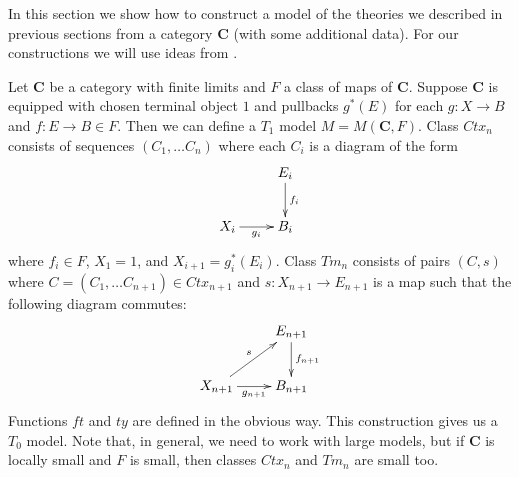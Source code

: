 \documentclass{amsart}
\theoremstyle{definition}
\theoremstyle{remark}
\newcommand{\cat}[1]{\mathbf{#1}}
\newcommand{\C}{\cat{C}}
\numberwithin{figure}{section}
\begin{document}
In this section we show how to construct a model of the theories we described in previous sections from a category $\C$ (with some additional data).
For our constructions we will use ideas from \cite{local-universes}.

Let $\C$ be a category with finite limits and $F$ a class of maps of $\C$.
Suppose $\C$ is equipped with chosen terminal object $1$ and pullbacks $g^*(E)$ for each $g : X \to B$ and $f : E \to B \in F$.
Then we can define a $T_1$ model $M = M(\C,F)$.
Class $Ctx_n$ consists of sequences $(C_1, \ldots C_n)$ where each $C_i$ is a diagram of the form
\[ \xymatrix{                  & E_i \ar[d]^{f_i} \\
              X_i \ar[r]_{g_i} & B_i
            } \]
where $f_i \in F$, $X_1 = 1$, and $X_{i+1} = g_i^*(E_i)$.
Class $Tm_n$ consists of pairs $(C,s)$ where $C = (C_1, \ldots C_{n+1}) \in Ctx_{n+1}$ and $s : X_{n+1} \to E_{n+1}$ is a map such that the following diagram commutes:
\[ \xymatrix{                                    & E_{n+1} \ar[d]^{f_{n+1}} \\
              X_{n+1} \ar[r]_{g_{n+1}} \ar[ur]^s & B_{n+1}
            } \]
Functions $ft$ and $ty$ are defined in the obvious way.
This construction gives us a $T_0$ model.
Note that, in general, we need to work with large models, but if $\C$ is locally small and $F$ is small, then classes $Ctx_n$ and $Tm_n$ are small too.



\end{document}
